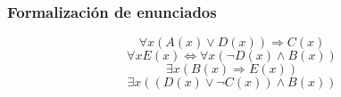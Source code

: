 \documentclass[letterpaper,10pt]{article}
\begin{document}
\subsubsection{Formalizaci\'on de enunciados}
\begin{minipage}[t]{0.4\textwidth}
\begin{equation}
     \forall x (A(x) \vee D(x)) \Rightarrow  C(x)
\end{equation}
\begin{equation}
    \forall x  E(x) \Leftrightarrow \forall x (\neg D(x) \wedge  B(x))
\end{equation}
\begin{equation}
    \exists x ( B(x) \Rightarrow E(x) )
\end{equation}
\begin{equation}
    \exists x (( D(x) \vee \neg C(x) ) \wedge B(x))
\end{equation}
\end{minipage}
\end{document}
